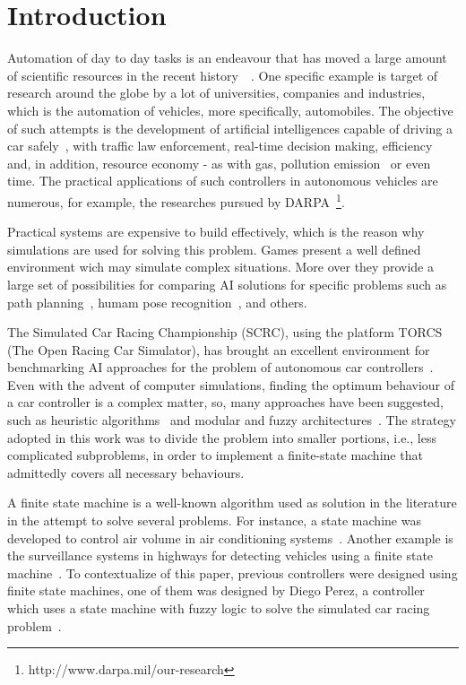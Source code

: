 \section{\textbf{Introduction}} \label{sec:Intro}
	
	Automation of day to day tasks is an endeavour that has moved a large amount of scientific resources in the recent history~\cite{INDUS}~\cite{APPLI}. One specific example is target of research around the globe by a lot of universities, companies	and industries, which is the automation of vehicles, more specifically, automobiles. The objective of such attempts is the development of artificial intelligences capable of driving a car safely~\cite{SAFE}, with traffic law enforcement, real-time decision making, efficiency and, in addition, resource economy - as with gas, pollution emission~\cite{AUTOM} or even time. The practical applications of such controllers in autonomous vehicles are numerous, for example, the researches pursued by DARPA~\footnote{http://www.darpa.mil/our-research}.
	
	Practical systems are expensive to build effectively, which is the reason why simulations are used for solving this problem. Games present a well defined environment wich may simulate complex situations. More over they provide a large set of possibilities for comparing AI solutions for specific problems such as path planning~\cite{deFreitas:2012}, humam pose recognition~\cite{Shotton:2011}, and others.

	The Simulated Car Racing Championship (SCRC), using the platform TORCS (The Open Racing Car Simulator), has	brought an excellent environment for benchmarking AI approaches for the problem of autonomous car controllers~\cite{2009}. Even with the advent of computer simulations, finding the optimum behaviour of a car controller is a complex matter, so, many approaches have been suggested, such as heuristic algorithms~\cite{MrRacer} and modular and fuzzy architectures~\cite{AUTOPIA}. The strategy adopted in this work was to divide the problem into smaller portions, i.e., less complicated subproblems, in order to implement a finite-state machine that admittedly covers all necessary behaviours.

    A finite state machine is a well-known algorithm used as solution in the literature in the attempt to solve several problems. For instance, a state machine was developed to control air volume in air conditioning systems~\cite{BERNARD}. Another example is the surveillance systems in highways for detecting vehicles using a finite state machine~\cite{DOHYUN}. To contextualize of this paper, previous controllers were designed using finite state machines, one of them was designed by Diego Perez, a controller which uses a state machine with fuzzy logic to solve the simulated car racing problem~\cite{DIEGO}.
	

